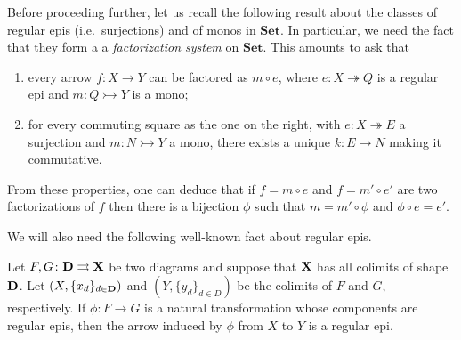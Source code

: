 \documentclass[3p]{elsarticle}
\newcommand{\Set}{\mathbf{Set}}
\def\D{\textbf {\textup{D}}}
\def\X{\textbf {\textup{X}}}
\newcommand{\mto}{\rightarrowtail}
\newcommand{\eto}{\twoheadrightarrow}
\theoremstyle{remark}
\theoremstyle{definition}
\begin{document}
\begin{rem}\label{rem:fact}
	Before proceeding further, let us recall the following result about the classes of regular epis (i.e.~surjections) and of monos in $\Set$. In particular, we need the fact that they form a a \emph{factorization system} \cite{kelly2006note} on $\Set$.  This amounts to ask that
	
	\noindent 
	\parbox{11.5cm}{
	\begin{enumerate} 
		\item every arrow $f\colon X\to Y$ can be factored as $m\circ e$, where $e\colon X\eto Q$ is a regular epi and $m\colon Q\mto Y$ is a mono;
			\item for every commuting square as the one on the right, with $e\colon X\eto E$ a surjection and $m\colon N\mto Y$ a mono, there exists a unique $k\colon E\to N$ making it commutative.
	\end{enumerate}}\hfill \parbox{2cm}{}
	
	\hspace{1pt}\newline 
	From these properties, one can deduce that if $f=m\circ e$ and $f=m'\circ e'$ are two factorizations of $f$ then there is a bijection $\phi$ such that $m=m'\circ \phi$ and $\phi \circ e=e'$.
\end{rem}

We will also need the following well-known fact about regular epis.

\begin{lem}\label{lemma:nat_trans_reg_epi_canonical_arrow_reg_epi}
	Let $F,G\colon \D\rightrightarrows \X$ be two diagrams and suppose that $\X$ has all colimits of shape $\D$. Let $(X, \{x_d\}_{d \in \D})$ and $(Y, \{y_d\}_{d\in D})$ be the colimits of $F$ and $G$, respectively.  If $\phi\colon  F \to G$ is a natural transformation whose components are regular epis, then the arrow induced by $\phi$ from $X$ to $Y$ is a regular epi.
\end{lem}

\noindent
\parbox{11.4cm}{
\comp*}\hfill 
\parbox{2cm}{}   
\end{document}
